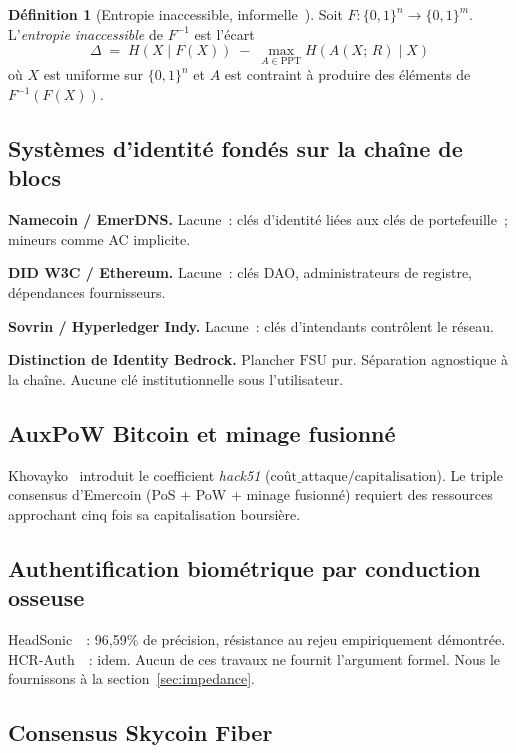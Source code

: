 \documentclass[11pt,a4paper]{article}
\theoremstyle{definition}
\newtheorem{definition}[theorem]{Définition}
\newcommand{\OWF}{\mathrm{FSU}}
\newcommand{\BD}{\textsf{Identity Bedrock}}
\begin{document}
\begin{definition}[Entropie inaccessible, informelle~{\cite{Haitner10}}]
\label{def:inaccessible}
Soit $F: \{0,1\}^n \to \{0,1\}^m$. L'\emph{entropie inaccessible}
de $F^{-1}$ est l'écart
\[
  \Delta \;=\; H(X \mid F(X)) \;-\; \max_{A \in \mathrm{PPT}}
  H(A(X;\,R) \mid X)
\]
où $X$ est uniforme sur $\{0,1\}^n$ et $A$ est contraint à produire
des éléments de $F^{-1}(F(X))$.
\end{definition}

\subsection{Systèmes d'identité fondés sur la chaîne de blocs}

\textbf{Namecoin / EmerDNS.} Lacune~: clés d'identité liées aux
clés de portefeuille~; mineurs comme AC implicite.

\textbf{DID W3C / Ethereum.} Lacune~: clés DAO, administrateurs de
registre, dépendances fournisseurs.

\textbf{Sovrin / Hyperledger Indy.} Lacune~: clés d'intendants
contrôlent le réseau.

\textbf{Distinction de \BD{}.} Plancher $\OWF$ pur. Séparation
agnostique à la chaîne. Aucune clé institutionnelle sous
l'utilisateur.

\subsection{AuxPoW Bitcoin et minage fusionné}

Khovayko~\cite{Kho21} introduit le coefficient \emph{hack51}
($\text{coût\_attaque} / \text{capitalisation}$). Le triple consensus
d'Emercoin (PoS + PoW + minage fusionné) requiert des ressources
approchant cinq fois sa capitalisation boursière.

\subsection{Authentification biométrique par conduction osseuse}

HeadSonic~\cite{HeadSonic25}~: 96,59\% de précision, résistance au
rejeu empiriquement démontrée. HCR-Auth~\cite{HCRAuth24}~: idem.
Aucun de ces travaux ne fournit l'argument formel. Nous le fournissons
à la section~\ref{sec:impedance}.

\subsection{Consensus Skycoin Fiber}
\end{document}
